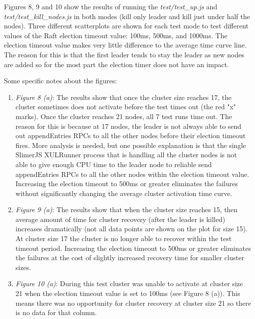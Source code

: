 \documentclass[9pt]{extarticle}
\begin{document}
\begin{multicols}{2}
Figures 8, 9 and 10 show the results of running the
\emph{test/test\_up.js} and \emph{test/test\_kill\_nodes.js} in both
modes (kill only leader and kill just under half the nodes). Three
different scatterplots are shown for each test mode to test different
values of the Raft election timeout value: 100ms, 500ms, and 1000ms.
The election timeout value makes very little difference to the average
time curve line. The reason for this is that the first leader tends to
stay the leader as new nodes are added so for the most part the
election timer does not have an impact.

Some specific notes about the figures:


\begin{enumerate}
    \item \emph{Figure 8 (a)}: The results show that once the cluster
        size reaches 17, the cluster sometimes does not activate
        before the test times out (the red "x" marks). Once the
        cluster reaches 21 nodes, all 7 test runs time out. The reason
        for this is because at 17 nodes, the leader is not always able
        to send out appendEntries RPCs to all the other nodes before
        their election timeout fires. More analysis is needed, but one
        possible explanation is that the single SlimerJS XULRunner
        process that is handling all the cluster nodes is not able to
        give enough CPU time to the leader node to reliable send
        appendEntries RPCs to all the other nodes within the election
        timeout value. Increasing the election timeout to 500ms or
        greater eliminates the failures without significantly changing
        the average cluster activation time curve.
    \item \emph{Figure 9 (a)}: The results show that when the cluster
        size reaches 15, then average amount of time for cluster
        recovery (after the leader is killed) increases dramatically
        (not all data points are shown on the plot for size 15). At
        cluster size 17 the cluster is no longer able to recover
        within the test timeout period. Increasing the election
        timeout to 500ms or greater eliminates the failures at the
        cost of slightly increased recovery time for smaller cluster
        sizes.
    \item \emph{Figure 10 (a)}: During this test cluster was unable to
        activate at cluster size 21 when the election timeout value is
        set to 100ms (see Figure 8 (a)). This means there was no
        opportunity for cluster recovery at cluster size 21 so there
        is no data for that column.


\end{enumerate}
\end{multicols}
\end{document}
